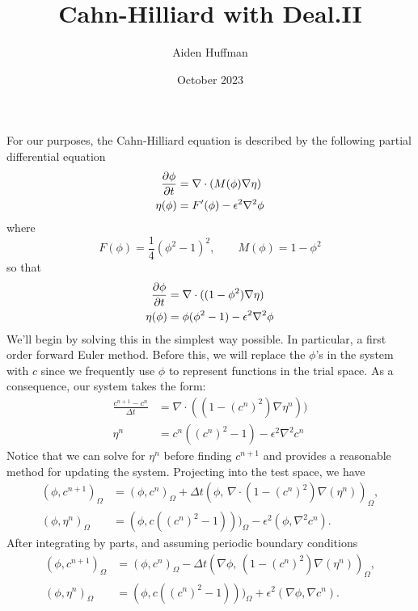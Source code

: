 \documentclass{article}
\title{Cahn-Hilliard with Deal.II}
\author{Aiden Huffman}
\date{October 2023}
\begin{document}
\maketitle

For our purposes, the Cahn-Hilliard equation is described by the following
partial differential equation
\begin{align}
    \diffp{\phi}{t} &= \nabla\cdot(M(\phi)\nabla\eta)\\
    \eta(\phi) &= F'(\phi)-\epsilon^2 \nabla^2 \phi\\
\end{align}
where
\begin{equation}
    F(\phi) = \frac{1}{4}(\phi^2-1)^2,\qquad M(\phi) = 1-\phi^2
\end{equation}
so that
\begin{align}
    \diffp{\phi}{t} &= \nabla\cdot((1-\phi^2)\nabla\eta)\\
    \eta(\phi) &= \phi(\phi^2-1) - \epsilon^2\nabla^2\phi 
\end{align}
We'll begin by solving this in the simplest way possible. In particular, a first
order forward Euler method. Before this, we will replace the $\phi$'s in the
system with $c$ since we frequently use $\phi$ to represent functions in the
trial space. As a consequence, our system takes the form:
\begin{align}
\frac{c^{n+1}-c^{n}}{\Delta t} &= \nabla\cdot((1-(c^n)^2)\nabla\eta^n))\\
\eta^n &= c^n((c^n)^2-1) - \epsilon^2 \nabla^2 c^n
\end{align}
Notice that we can solve for $\eta^n$ before finding $c^{n+1}$ and provides a
reasonable method for updating the system. Projecting into the test space, we
have
\begin{align}
    (\phi, c^{n+1})_\Omega  &= (\phi, c^n)_\Omega
                            + \Delta t (
                                \phi,\,
                                \nabla\cdot(1-(c^n)^2)\nabla(\eta^n)
                            )_\Omega,\\
    (\phi, \eta^n)_\Omega   &= (\phi, c((c^n)^2-1)))_\Omega 
                            - \epsilon^2(\phi,\nabla^2 c^n).
\end{align}
After integrating by parts, and assuming periodic boundary conditions
\begin{align}
    (\phi, c^{n+1})_\Omega  &= (\phi, c^n)_\Omega
                            - \Delta t (
                                \nabla \phi,\,
                                (1-(c^n)^2)\nabla(\eta^n)
                            )_\Omega,\\
    (\phi, \eta^n)_\Omega   &= (\phi, c((c^n)^2-1)))_\Omega 
                            + \epsilon^2(\nabla \phi,\nabla c^n).
\end{align}
\end{document}

